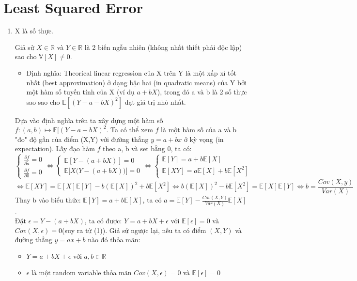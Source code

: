 \documentclass[10pt]{article}
\begin{document}
\section{Least Squared Error} 
\begin{enumerate}
\item X là số thực.


Giả sử $X \in \mathbb{R}$ và $Y \in \mathbb{R}$ là 2 biến ngẫu nhiên (không nhất thiết phải độc lập) sao cho $\mathbb{V}[X] \neq 0$.
\begin{itemize}

\item Định nghĩa: Theorical linear regression của X trên Y là một xấp xỉ tốt nhất (best approximation) ở dạng bậc hai (in quadratic means) của Y bởi một hàm số tuyến tính của X (ví dụ $a + bX$), trong đó a và b là 2 số thực sao sao cho $\mathbb{E}[(Y - a - bX)^2]$ đạt giá trị nhỏ nhất.
\end{itemize}

Dựa vào định nghĩa trên ta xây dựng một hàm số $f:(a,b)\longmapsto \mathbb{E}[(Y - a - bX)^2$. Ta có thể xem $f$ là một hàm số của a và b "đo" độ gần của điểm (X,Y) với đường thẳng $y = a + bx$ ở kỳ vọng (in expectation). Lấy đạo hàm $f$ theo a, b và set bằng 0, ta có:
\[\begin{cases} \frac{\partial f}{\partial \tilde{a}} = 0 \\ \frac{\partial f}{\partial 0} = 0\end{cases} \Longleftrightarrow \begin{cases} \mathbb{E}[Y-(a+bX)] =0 \\ \mathbb{E}\Big[X \Big(Y-(a+bX) \Big)\Big] =0 \end{cases} \Longleftrightarrow \begin{cases}  \mathbb{E}[Y] = a + b\mathbb{E}[X] \tag{1} \\ \mathbb{E}[XY] =  a\mathbb{E}[X] + b\mathbb{E}[X^2]  \end{cases}  \] 
\[\Longleftrightarrow  \mathbb{E}[XY] = \mathbb{E}[X]\mathbb{E}[Y] - b(\mathbb{E}[X])^2 + b\mathbb{E}[X^2] \Longleftrightarrow b(\mathbb{E}[X])^2 - b\mathbb{E}[X^2] = \mathbb{E}[X]\mathbb{E}[Y] \Longleftrightarrow b= \frac{Cov(X,y)}{Var(X)}\]
Thay b vào biểu thức: $\mathbb{E}[Y] = a + b\mathbb{E}[X]$, ta có $a=\mathbb{E}[Y] - \frac{Cov(X,Y)}{Var(X)}\mathbb{E}[X]$.\\
Đặt $\epsilon = Y - (a+bX)$, ta có được: $Y = a + bX + \epsilon $ với $\mathbb{E}[\epsilon] = 0$ và $Cov(X, \epsilon) = 0$(suy ra từ (1)). Giả sử ngược lại, nếu ta có điểm $(X, Y)$ và đường thẳng $y = ax + b$ nào đó thỏa mãn:\\
\begin{itemize}
\item $Y = a+bX+\epsilon$ với $a,b \in \mathbb{R}$ 
\item $\epsilon$ là một random variable thỏa mãn $Cov(X,\epsilon) = 0$ và $\mathbb{E}[\epsilon] = 0$


\end{itemize}
\end{enumerate}
\end{document}
